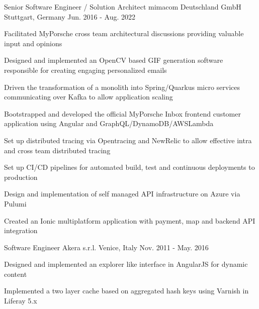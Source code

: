 \begin{cventries}
  \cventry
    {Senior Software Engineer / Solution Architect} %
    {mimacom Deutschland GmbH} %
    {Stuttgart, Germany} %
    {Jun. 2016 - Aug. 2022} %
    {
      \begin{cvitems} %
        \item {Facilitated MyPorsche cross team architectural discussions providing valuable input and opinions}
        \item {Designed and implemented an OpenCV based GIF generation software responsible for creating engaging personalized emails}
        \item {Driven the transformation of a monolith into Spring/Quarkus micro services communicating over Kafka to allow application scaling}
        \item {Bootstrapped and developed the official MyPorsche Inbox frontend customer application using Angular and GraphQL/DynamoDB/AWSLambda}
        \item {Set up distributed tracing via Opentracing and NewRelic to allow effective intra and cross team distributed tracing}
        \item {Set up CI/CD pipelines for automated build, test and continuous deployments to production}
        \item {Design and implementation of self managed API infrastructure on Azure via Pulumi}
        \item {Created an Ionic multiplatform application with payment, map and backend API integration}
      \end{cvitems}
    }

  \cventry
    {Software Engineer} %
    {Akera s.r.l.} %
    {Venice, Italy} %
    {Nov. 2011 - May. 2016} %
    {
      \begin{cvitems} %
        \item {Designed and implemented an explorer like interface in AngularJS for dynamic content}
        \item {Implemented a two layer cache based on aggregated hash keys using Varnish in Liferay 5.x}
      \end{cvitems}
    }

\end{cventries}

